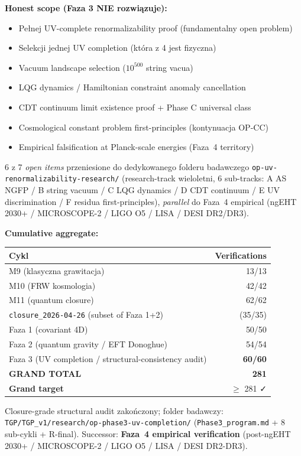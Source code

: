 \begin{remark}
\medskip
\noindent\textbf{Honest scope (Faza 3 NIE rozwi\k{a}zuje):}
\begin{itemize}\itemsep0pt
  \item Pe\l{}nej UV-complete renormalizability proof (fundamentalny open problem)
  \item Selekcji jednej UV completion (kt\'ora z 4 jest fizyczna)
  \item Vacuum landscape selection ($10^{500}$ string vacua)
  \item LQG dynamics / Hamiltonian constraint anomaly cancellation
  \item CDT continuum limit existence proof + Phase C universal class
  \item Cosmological constant problem first-principles (kontynuacja OP-CC)
  \item Empirical falsification at Planck-scale energies (Faza~4 territory)
\end{itemize}
6 z 7 \emph{open items} przeniesione do dedykowanego folderu badawczego
\texttt{op-uv-renormalizability-research/} (research-track wieloletni,
6 sub-tracks: A AS NGFP / B string vacuum / C LQG dynamics / D CDT continuum /
E UV discrimination / F residua first-principles), \emph{parallel} do Faza~4
empirical (ngEHT 2030+ / MICROSCOPE-2 / LIGO O5 / LISA / DESI DR2/DR3).

\medskip
\noindent\textbf{Cumulative aggregate:}
\begin{center}\footnotesize
\begin{tabular}{@{}lr@{}}
\toprule
\textbf{Cykl} & \textbf{Verifications} \\
\midrule
M9 (klasyczna grawitacja) & 13/13 \\
M10 (FRW kosmologia) & 42/42 \\
M11 (quantum closure) & 62/62 \\
\texttt{closure\_2026-04-26} (subset of Faza 1+2) & (35/35) \\
Faza 1 (covariant 4D) & 50/50 \\
Faza 2 (quantum gravity / EFT Donoghue) & 54/54 \\
Faza 3 (UV completion / structural-consistency audit) & \textbf{60/60} \\
\midrule
\textbf{GRAND TOTAL} & \textbf{281} \\
\textbf{Grand target} & $\geq$ 281 ✓ \\
\bottomrule
\end{tabular}
\end{center}

\noindent
Closure-grade structural audit zako\'nczony; folder badawczy:
\texttt{TGP/TGP\_v1/research/op-phase3-uv-completion/}
(\texttt{Phase3\_program.md} + 8 sub-cykli + R-final).
Successor: \textbf{Faza~4 empirical verification}
(post-ngEHT 2030+ / MICROSCOPE-2 / LIGO O5 / LISA / DESI DR2-DR3).
\end{remark}

